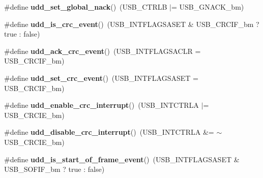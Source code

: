 \begin{DoxyCompactItemize}
\item 
\hypertarget{group__udd__xmega__usb__group_gaef53e2de128cd33b05901c707c1509fd}{\#define {\bfseries udd\-\_\-set\-\_\-global\-\_\-nack}()~(U\-S\-B\-\_\-\-C\-T\-R\-L\-B $|$= U\-S\-B\-\_\-\-G\-N\-A\-C\-K\-\_\-bm)}\label{group__udd__xmega__usb__group_gaef53e2de128cd33b05901c707c1509fd}

\item 
\hypertarget{group__udd__xmega__usb__group_ga3a13ddb16a3d9cb4b79576ce1e895f7e}{\#define {\bfseries udd\-\_\-is\-\_\-crc\-\_\-event}()~(U\-S\-B\-\_\-\-I\-N\-T\-F\-L\-A\-G\-S\-A\-S\-E\-T \& U\-S\-B\-\_\-\-C\-R\-C\-I\-F\-\_\-bm ? true \-: false)}\label{group__udd__xmega__usb__group_ga3a13ddb16a3d9cb4b79576ce1e895f7e}

\item 
\hypertarget{group__udd__xmega__usb__group_ga97e65f575190ed3b68dcef62a699b7cc}{\#define {\bfseries udd\-\_\-ack\-\_\-crc\-\_\-event}()~(U\-S\-B\-\_\-\-I\-N\-T\-F\-L\-A\-G\-S\-A\-C\-L\-R = U\-S\-B\-\_\-\-C\-R\-C\-I\-F\-\_\-bm)}\label{group__udd__xmega__usb__group_ga97e65f575190ed3b68dcef62a699b7cc}

\item 
\hypertarget{group__udd__xmega__usb__group_ga034017fceeeaa75f26b7cdc657608180}{\#define {\bfseries udd\-\_\-set\-\_\-crc\-\_\-event}()~(U\-S\-B\-\_\-\-I\-N\-T\-F\-L\-A\-G\-S\-A\-S\-E\-T = U\-S\-B\-\_\-\-C\-R\-C\-I\-F\-\_\-bm)}\label{group__udd__xmega__usb__group_ga034017fceeeaa75f26b7cdc657608180}

\item 
\hypertarget{group__udd__xmega__usb__group_ga059c595bb4ed526b8f3d22ad6263874a}{\#define {\bfseries udd\-\_\-enable\-\_\-crc\-\_\-interrupt}()~(U\-S\-B\-\_\-\-I\-N\-T\-C\-T\-R\-L\-A $|$= U\-S\-B\-\_\-\-C\-R\-C\-I\-E\-\_\-bm)}\label{group__udd__xmega__usb__group_ga059c595bb4ed526b8f3d22ad6263874a}

\item 
\hypertarget{group__udd__xmega__usb__group_ga7d8e4f646264a620a2d413b5ad03feaf}{\#define {\bfseries udd\-\_\-disable\-\_\-crc\-\_\-interrupt}()~(U\-S\-B\-\_\-\-I\-N\-T\-C\-T\-R\-L\-A \&= $\sim$U\-S\-B\-\_\-\-C\-R\-C\-I\-E\-\_\-bm)}\label{group__udd__xmega__usb__group_ga7d8e4f646264a620a2d413b5ad03feaf}

\item 
\hypertarget{group__udd__xmega__usb__group_ga680f2a7b6011b34731880b34e315128b}{\#define {\bfseries udd\-\_\-is\-\_\-start\-\_\-of\-\_\-frame\-\_\-event}()~(U\-S\-B\-\_\-\-I\-N\-T\-F\-L\-A\-G\-S\-A\-S\-E\-T \& U\-S\-B\-\_\-\-S\-O\-F\-I\-F\-\_\-bm ? true \-: false)}\label{group__udd__xmega__usb__group_ga680f2a7b6011b34731880b34e315128b}


\end{DoxyCompactItemize}

